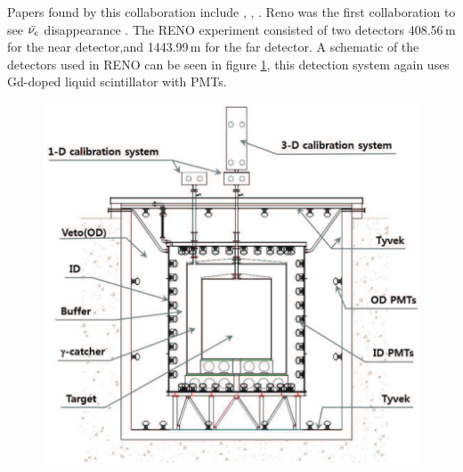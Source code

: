 Papers found by this collaboration include \cite{reno_may_2012}, \cite{reno2013},  \cite{reno_may_2019}. Reno was the first collaboration to see $\Bar{\nu_e}$ disappearance \cite{Olive_2014}. The RENO experiment consisted of two detectors 408.56\,m for the near detector,and 1443.99\,m for the far detector. A schematic of the detectors used in RENO can be seen in figure \ref{RENO_detector}, this detection system again uses Gd-doped liquid scintillator with PMTs. 

\begin{figure}[htbp]
 \centering
 \includegraphics[width=0.5\linewidth]{Chapter2/Figs/Raster/RENO_detector.png} %
 \label{RENO_detector}
\end{figure}

